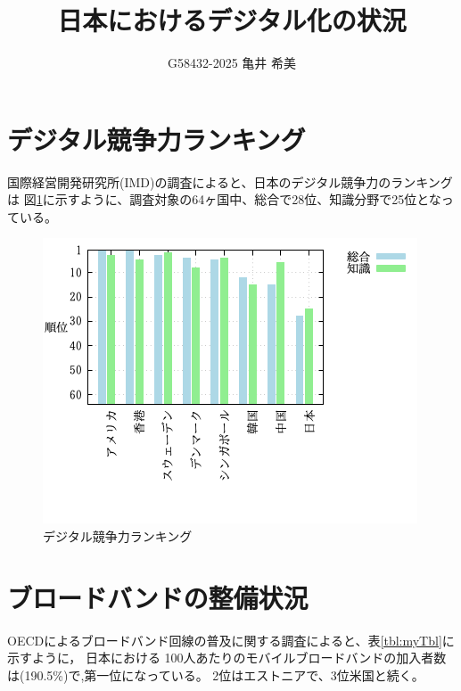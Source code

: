 \documentclass[a4paper,11pt,dvipdfmx]{ujarticle}
\title{日本におけるデジタル化の状況}
\author{G58432-2025 亀井 希美}
\begin{document}
\maketitle
 \section{デジタル競争力ランキング}

国際経営開発研究所(IMD)の調査\cite{imd}によると、日本のデジタル競争力のランキングは
図\ref{fig:myfig}に示すように、調査対象の64ヶ国中、総合で28位、知識分野で25位となっている。
\begin{figure}[htbp]
    \centering
    \includegraphics{fig31.png}
    \caption{デジタル競争力ランキング}\label{fig:myfig}
\end{figure}

\section{ブロードバンドの整備状況}
OECDによるブロードバンド回線の普及に関する調査\cite{oecd}によると、表\ref{tbl:myTbl}に示すように，
日本における 100人あたりのモバイルブロードバンドの加入者数は(190.5\%)で,第一位になっている。
2位はエストニアで、3位米国と続く。
\end{document}
